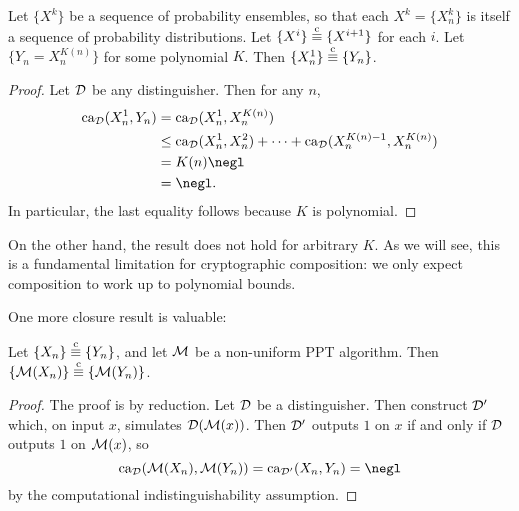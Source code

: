 \begin{prop}
  Let $\{X^k\}$ be a sequence of probability ensembles, so
  that each $X^k = \{X^k_n\}$ is itself a sequence of probability distributions.
  Let $\{X^i\}\overset{\text{c}}{\equiv}\{X^{i+1}\}$ for each $i$. Let $\{Y_n = X^{K(n)}_n\}$ for
  some polynomial $K$. Then $\{X^1_n\}\overset{\text{c}}{\equiv}\{Y_n\}$.
\end{prop}

\begin{proof}
  Let $\mathcal{D}$ be any distinguisher. Then for any $n$, \begin{align*}
    \ca_\cD(X^1_n, Y_n) &= \ca_\cD(X^1_n, X^{K(n)}_n) \\
                          &\leq \ca_\cD(X^1_n, X^2_n) + \cdots + \ca_\cD(X^{K(n) - 1}_n, X^{K(n)}_n) \\
                          &= K(n)\negl \\
                          &= \negl.
   \end{align*}
   In particular, the last equality follows because $K$ is polynomial.
\end{proof}

On the other hand, the result does not hold for arbitrary $K$. As we will see,
this is a fundamental limitation for cryptographic composition: we only expect
composition to work up to polynomial bounds.

One more closure result is valuable:

\begin{prop}\label{thm:ci-composition}
  Let $\{X_n\}\overset{\text{c}}{\equiv}\{Y_n\}$, and let $\mathcal{M}$ be a non-uniform PPT algorithm. Then
  $\{\mathcal{M}(X_n)\} \overset{\text{c}}{\equiv} \{\mathcal{M}(Y_n)\}$.
\end{prop}

\begin{proof}
  The proof is by reduction. Let $\mathcal{D}$ be a distinguisher. Then construct $\mathcal{D}'$
  which, on input $x$, simulates $\mathcal{D}(\mathcal{M}(x))$. Then $\mathcal{D}'$ outputs $1$ on $x$ if and
  only if $\mathcal{D}$ outputs $1$ on $\mathcal{M}(x)$, so \[
    \ca_\cD(\cM(X_n), \cM(Y_n)) = \ca_{\cD'}(X_n, Y_n) = \negl
  \] by the computational indistinguishability assumption.
\end{proof}

